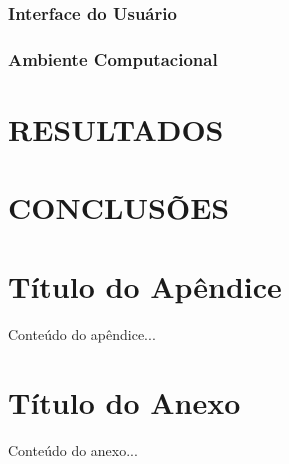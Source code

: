 \documentclass[12pt,oneside]{report}
\begin{document}
\subsection{Interface do Usuário}


\subsection{Ambiente Computacional}




\chapter{RESULTADOS}

\chapter{CONCLUSÕES}

\printbibliography[title={REFERÊNCIAS},heading=bibnumbered]

\appendix

\chapter{Título do Apêndice}
Conteúdo do apêndice...

\chapter{Título do Anexo}
Conteúdo do anexo...
\end{document}
